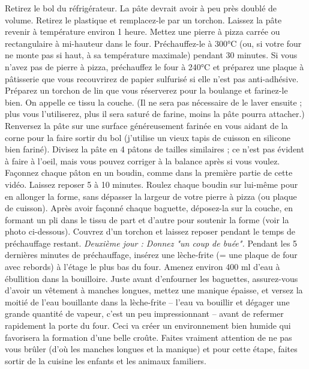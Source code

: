 \ingredient{}Retirez le bol du réfrigérateur. La pâte devrait avoir à peu près doublé de volume.
\ingredient{}Retirez le plastique et remplacez-le par un torchon. Laissez la pâte revenir à température environ 1 heure.
\ingredient{}Mettez une pierre à pizza carrée ou rectangulaire à mi-hauteur dans le four. Préchauffez-le à 300°C (ou, si votre four ne monte pas si haut, à sa température maximale) pendant 30 minutes. Si vous n'avez pas de pierre à pizza, préchauffez le four à 240°C et préparez une plaque à pâtisserie que vous recouvrirez de papier sulfurisé si elle n'est pas anti-adhésive.
\ingredient{}Préparez un torchon de lin que vous réserverez pour la boulange et farinez-le bien. On appelle ce tissu la couche. (Il ne sera pas nécessaire de le laver ensuite ; plus vous l'utiliserez, plus il sera saturé de farine, moins la pâte pourra attacher.)
\ingredient{}Renversez la pâte sur une surface généreusement farinée en vous aidant de la corne pour la faire sortir du bol (j'utilise un vieux tapis de cuisson en silicone bien fariné). Divisez la pâte en 4 pâtons de tailles similaires ; ce n'est pas évident à faire à l'oeil, mais vous pouvez corriger à la balance après si vous voulez.
\ingredient{}Façonnez chaque pâton en un boudin, comme dans la première partie de cette vidéo. Laissez reposer 5 à 10 minutes.
\ingredient{}Roulez chaque boudin sur lui-même pour en allonger la forme, sans dépasser la largeur de votre pierre à pizza (ou plaque de cuisson). Après avoir façonné chaque baguette, déposez-la sur la couche, en formant un pli dans le tissu de part et d'autre pour soutenir la forme (voir la photo ci-dessous). Couvrez d'un torchon et laissez reposer pendant le temps de préchauffage restant.
\ingredient{}
\ingredient{}\textit{Deuxième jour : Donnez "un coup de buée".}
\ingredient{}Pendant les 5 dernières minutes de préchauffage, insérez une lèche-frite (= une plaque de four avec rebords) à l'étage le plus bas du four. Amenez environ 400 ml d'eau à ébullition dans la bouilloire. Juste avant d'enfourner les baguettes, assurez-vous d'avoir un vêtement à manches longues, mettez une manique épaisse, et versez la moitié de l'eau bouillante dans la lèche-frite -- l'eau va bouillir et dégager une grande quantité de vapeur, c'est un peu impressionnant -- avant de refermer rapidement la porte du four.
\ingredient{}Ceci va créer un environnement bien humide qui favorisera la formation d'une belle croûte. Faites vraiment attention de ne pas vous brûler (d'où les manches longues et la manique) et pour cette étape, faites sortir de la cuisine les enfants et les animaux familiers.
